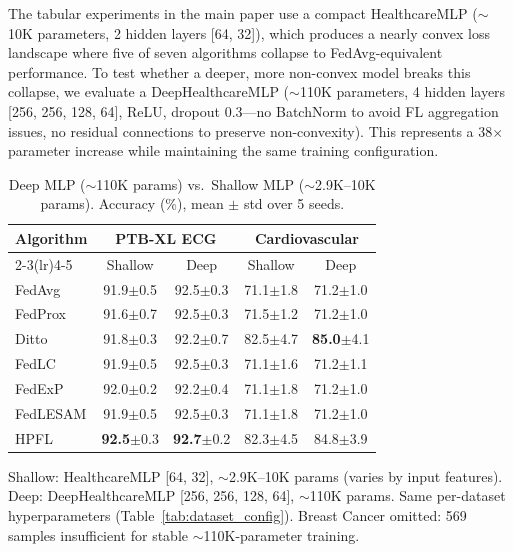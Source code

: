 \documentclass[conference]{IEEEtran}
\begin{document}
The tabular experiments in the main paper use a compact HealthcareMLP ($\sim$10K parameters, 2 hidden layers [64, 32]), which produces a nearly convex loss landscape where five of seven algorithms collapse to FedAvg-equivalent performance. To test whether a deeper, more non-convex model breaks this collapse, we evaluate a DeepHealthcareMLP ($\sim$110K parameters, 4 hidden layers [256, 256, 128, 64], ReLU, dropout 0.3---no BatchNorm to avoid FL aggregation issues, no residual connections to preserve non-convexity). This represents a 38$\times$ parameter increase while maintaining the same training configuration.

\begin{table}[htbp]
\centering
\caption{Deep MLP ($\sim$110K params) vs.\ Shallow MLP ($\sim$2.9K--10K params). Accuracy (\%), mean $\pm$ std over 5 seeds.}
\label{tab:deep_mlp}
\small
\begin{tabular}{lcccc}
\toprule
\textbf{Algorithm} & \multicolumn{2}{c}{\textbf{PTB-XL ECG}} & \multicolumn{2}{c}{\textbf{Cardiovascular}} \\
\cmidrule(lr){2-3}\cmidrule(lr){4-5}
 & Shallow & Deep & Shallow & Deep \\
\midrule
FedAvg & 91.9{\tiny$\pm$0.5} & 92.5{\tiny$\pm$0.3} & 71.1{\tiny$\pm$1.8} & 71.2{\tiny$\pm$1.0} \\
FedProx & 91.6{\tiny$\pm$0.7} & 92.5{\tiny$\pm$0.3} & 71.5{\tiny$\pm$1.2} & 71.2{\tiny$\pm$1.0} \\
Ditto & 91.8{\tiny$\pm$0.3} & 92.2{\tiny$\pm$0.7} & 82.5{\tiny$\pm$4.7} & \textbf{85.0}{\tiny$\pm$4.1} \\
FedLC & 91.9{\tiny$\pm$0.5} & 92.5{\tiny$\pm$0.3} & 71.1{\tiny$\pm$1.6} & 71.2{\tiny$\pm$1.1} \\
FedExP & 92.0{\tiny$\pm$0.2} & 92.2{\tiny$\pm$0.4} & 71.1{\tiny$\pm$1.8} & 71.2{\tiny$\pm$1.0} \\
FedLESAM & 91.9{\tiny$\pm$0.5} & 92.5{\tiny$\pm$0.3} & 71.1{\tiny$\pm$1.8} & 71.2{\tiny$\pm$1.0} \\
HPFL & \textbf{92.5}{\tiny$\pm$0.3} & \textbf{92.7}{\tiny$\pm$0.2} & 82.3{\tiny$\pm$4.5} & 84.8{\tiny$\pm$3.9} \\
\bottomrule
\end{tabular}

\vspace{1mm}
\footnotesize{Shallow: HealthcareMLP [64, 32], $\sim$2.9K--10K params (varies by input features). Deep: DeepHealthcareMLP [256, 256, 128, 64], $\sim$110K params. Same per-dataset hyperparameters (Table~\ref{tab:dataset_config}). Breast Cancer omitted: 569 samples insufficient for stable $\sim$110K-parameter training.}
\end{table}
\end{document}

